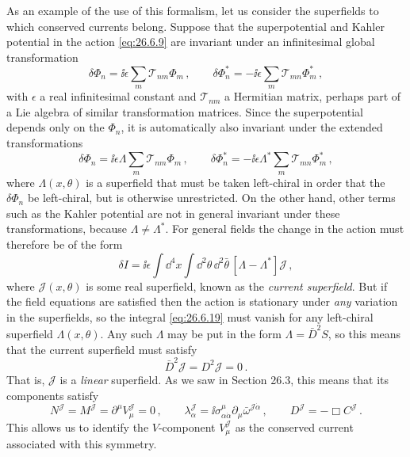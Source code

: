 As an example of the use of this formalism, let us consider the superfields to
which conserved currents belong. Suppose that the superpotential and Kahler
potential in the action \eqref{eq:26.6.9} are invariant under an infinitesimal
global transformation
\begin{equation}
  \delta\Phi_n=\ii\epsilon\sum_m\mathcal{T}_{nm}\Phi_m\,,
  \qquad
  \delta\Phi_n^*=-\ii\epsilon\sum_m\mathcal{T}_{mn}\Phi_m^*\,,
  \tag{26.6.17}\label{eq:26.6.17}
\end{equation}
with \(\epsilon\) a real infinitesimal constant and \(\mathcal{T}_{nm}\) a
Hermitian matrix, perhaps part of a Lie algebra of similar transformation
matrices. Since the superpotential depends only on the \(\Phi_n\), it is
automatically also invariant under the extended transformations
\begin{equation}
  \delta\Phi_n=\ii\epsilon\Lambda\sum_m\mathcal{T}_{nm}\Phi_m\,,
  \qquad
  \delta\Phi_n^*=-\ii\epsilon\Lambda^*
    \sum_m\mathcal{T}_{mn}\Phi_m^*\,,
  \tag{26.6.18}\label{eq:26.6.18}
\end{equation}
where \(\Lambda(x,\theta)\) is a superfield that must be taken left-chiral in
order that the \(\delta\Phi_n\) be left-chiral, but is otherwise unrestricted.
On the other hand, other terms such as the Kahler potential are not in
general invariant under these transformations, because
\(\Lambda\neq\Lambda^*\). For general fields the change in the action must
therefore be of the form
\begin{equation}
  \delta I
  =\ii\epsilon\int \dd^4x\int \dd^2\theta\,\dd^2\bar\theta\,
    [\Lambda-\Lambda^*]\mathcal{J}\,,
  \tag{26.6.19}\label{eq:26.6.19}
\end{equation}
where \(\mathcal{J}(x,\theta)\) is some real superfield, known as the
\emph{current superfield}. But if the field equations are satisfied then the
action is stationary under \emph{any} variation in the superfields, so the
integral \eqref{eq:26.6.19} must vanish for any left-chiral superfield
\(\Lambda(x,\theta)\). Any such \(\Lambda\) may be put in the form
\(\Lambda=\bar D^2S\), so this means that the current superfield must
satisfy
\begin{equation}
  \bar D^2\mathcal{J}=D^2\mathcal{J}=0\,.
  \tag{26.6.20}\label{eq:26.6.20}
\end{equation}
That is, \(\mathcal{J}\) is a \emph{linear} superfield. As we saw in Section
26.3, this means that its components satisfy
\begin{equation}
  N^{\mathcal{J}}=M^{\mathcal{J}}
  =\partial^\mu V_\mu^{\mathcal{J}}=0\,,
  \qquad
  \lambda_\alpha^{\mathcal{J}}
  =\ii\sigma^\mu_{\alpha\dot\alpha}\partial_\mu
    \bar\omega^{\mathcal{J}\dot\alpha}\,,
  \qquad
  D^{\mathcal{J}}=-\Box C^{\mathcal{J}}\,.
  \tag{26.6.21}\label{eq:26.6.21}
\end{equation}
This allows us to identify the \(V\)-component \(V_\mu^{\mathcal{J}}\) as the
conserved current associated with this symmetry.

